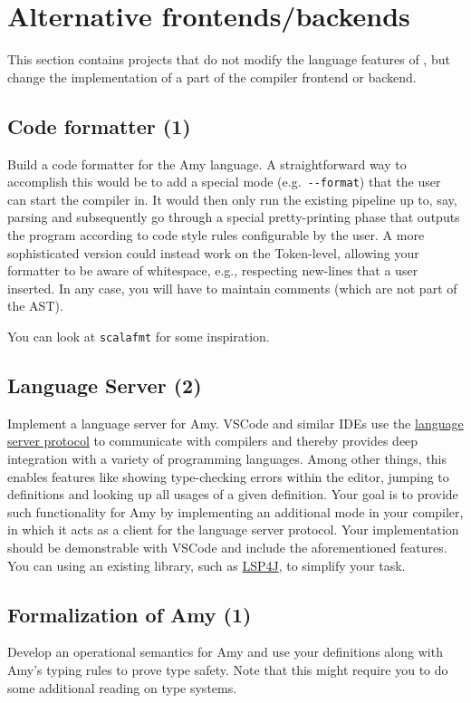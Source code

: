 \section{Alternative frontends/backends}
This section contains projects that do not modify the language features of \langname,
but change the implementation of a part of the \langname compiler frontend or backend.


\subsection{Code formatter (1)}
Build a code formatter for the Amy language.
A straightforward way to accomplish this would be to add a special mode
(e.g.\ \lstinline{--format}) that the user can start the compiler in.
It would then only run the existing pipeline up to, say, parsing and subsequently go
through a special pretty-printing phase that outputs the program according to code style
rules configurable by the user.
%
A more sophisticated version could instead work on the Token-level, allowing your
formatter to be aware of whitespace, e.g., respecting new-lines that a user inserted.
%
In any case, you will have to maintain comments (which are not part of the AST).

You can look at \lstinline{scalafmt} for some inspiration.

\subsection{Language Server (2)}
Implement a language server for Amy. VSCode and similar IDEs use the \href{https://en.wikipedia.org/wiki/Language_Server_Protocol}{language server protocol} to communicate with compilers and thereby provides deep integration with a variety of programming languages. Among other things, this enables features like showing type-checking errors within the editor, jumping to definitions and looking up all usages of a given definition. Your goal is to provide such functionality for Amy by implementing an additional mode in your compiler, in which it acts as a client for the language server protocol. Your implementation should be demonstrable with VSCode and include the aforementioned features. You can using an existing library, such as \href{https://github.com/eclipse/lsp4j}{LSP4J}, to simplify your task.

\subsection{Formalization of Amy (1)}
Develop an operational semantics for Amy and use your definitions along with Amy's typing rules to prove type safety. Note that this might require you to do some additional reading on type systems.

